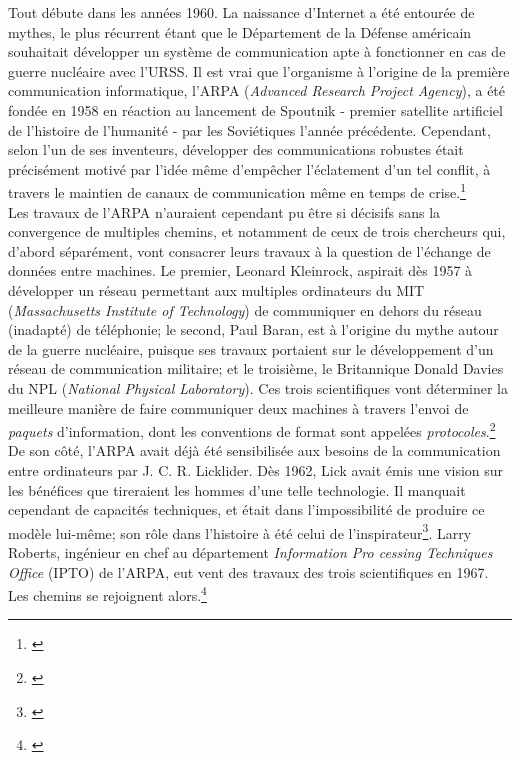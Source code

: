 \documentclass[a4paper,12pt,twoside]{book}
\begin{document}
Tout débute dans les années 1960. La naissance d'Internet a été entourée de mythes, le plus récurrent étant que le Département de la Défense américain souhaitait développer un système de communication apte à fonctionner en cas de guerre nucléaire avec l'URSS. Il est vrai que l'organisme à l'origine de la première communication informatique, l'ARPA (\textit{Advanced Research Project Agency}), a été fondée en 1958 en réaction au lancement de Spoutnik - premier satellite artificiel de l'histoire de l'humanité - par les Soviétiques l'année précédente. Cependant, selon l'un de ses inventeurs, développer des communications robustes était précisément motivé par l'idée même d'empêcher l'éclatement d'un tel conflit, à travers le maintien de canaux de communication même en temps de crise.\footnote{\cite[p.~15-16]{ceruzziAuxOriginesAmericaines2012}}\\

Les travaux de l'ARPA n'auraient cependant pu être si décisifs sans la convergence de multiples chemins, et notamment de ceux de trois chercheurs qui, d'abord séparément, vont consacrer leurs travaux à la question de l'échange de données entre machines. Le premier, Leonard Kleinrock, aspirait dès 1957 à développer un réseau permettant aux multiples ordinateurs du MIT (\textit{Massachusetts Institute of Technology}) de communiquer en dehors du réseau (inadapté) de téléphonie; le second, Paul Baran, est à l'origine du mythe autour de la guerre nucléaire, puisque ses travaux portaient sur le développement d'un réseau de communication militaire; et le troisième, le Britannique Donald Davies du NPL (\textit{National Physical Laboratory}). Ces trois scientifiques vont déterminer la meilleure manière de faire communiquer deux machines à travers l'envoi de \textit{paquets} d'information, dont les conventions de format sont appelées \textit{protocoles}.\footnote{\cite[p.~26-28]{kleinrockEarlyHistoryInternet2010}}\\

De son côté, l'ARPA avait déjà été sensibilisée aux besoins de la communication entre ordinateurs par J. C. R. Licklider. Dès 1962, \og Lick \fg{} avait émis une vision sur les bénéfices que tireraient les hommes d'une telle technologie. Il manquait cependant de capacités techniques, et était dans l'impossibilité de produire ce modèle lui-même; son rôle dans l'histoire à été celui de l'inspirateur\footnote{\cite[p.~28]{kleinrockEarlyHistoryInternet2010}}. Larry Roberts, ingénieur en chef au département \textit{Information Pro cessing Techniques Office} (IPTO) de l'ARPA, eut vent des travaux des trois scientifiques en 1967. Les chemins se rejoignent alors.\footnote{\cite[p.~16]{ceruzziAuxOriginesAmericaines2012}}\\
\end{document}
